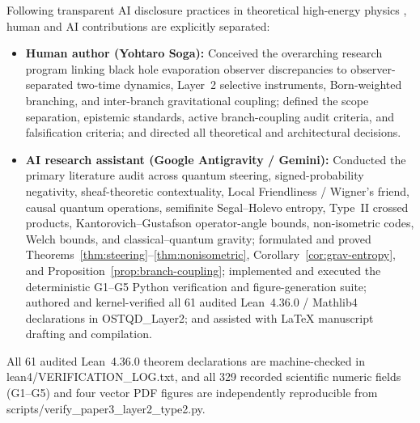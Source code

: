 \documentclass[11pt,a4paper]{article}
\theoremstyle{definition}
\theoremstyle{remark}
\newcommand{\1}{\mathbf{1}}
\newcommand{\code}[1]{{\scriptsize\ttfamily #1}}
\begin{document}
Following transparent AI disclosure practices in theoretical high-energy physics \cite{Michel2026}, human and AI contributions are explicitly separated:
\begin{itemize}
  \item \textbf{Human author (Yohtaro Soga):} Conceived the overarching research program linking black hole evaporation observer discrepancies to observer-separated two-time dynamics, Layer~2 selective instruments, Born-weighted branching, and inter-branch gravitational coupling; defined the scope separation, epistemic standards, active branch-coupling audit criteria, and falsification criteria; and directed all theoretical and architectural decisions.
  \item \textbf{AI research assistant (Google Antigravity / Gemini):} Conducted the primary literature audit across quantum steering, signed-probability negativity, sheaf-theoretic contextuality, Local Friendliness / Wigner's friend, causal quantum operations, semifinite Segal--Holevo entropy, Type~II crossed products, Kantorovich--Gustafson operator-angle bounds, non-isometric codes, Welch bounds, and classical--quantum gravity; formulated and proved Theorems~\ref{thm:steering}--\ref{thm:nonisometric}, Corollary~\ref{cor:grav-entropy}, and Proposition~\ref{prop:branch-coupling}; implemented and executed the deterministic G1--G5 Python verification and figure-generation suite; authored and kernel-verified all 61 audited Lean~4.36.0 / Mathlib4 declarations in \code{OSTQD\_Layer2}; and assisted with LaTeX manuscript drafting and compilation.
\end{itemize}
All 61 audited Lean~4.36.0 theorem declarations are machine-checked in \code{lean4/\allowbreak VERIFICATION\_\allowbreak LOG.txt}, and all 329 recorded scientific numeric fields (G1--G5) and four vector PDF figures are independently reproducible from \code{scripts/\allowbreak verify\_\allowbreak paper3\_\allowbreak layer2\_\allowbreak type2.py}.



\end{document}
